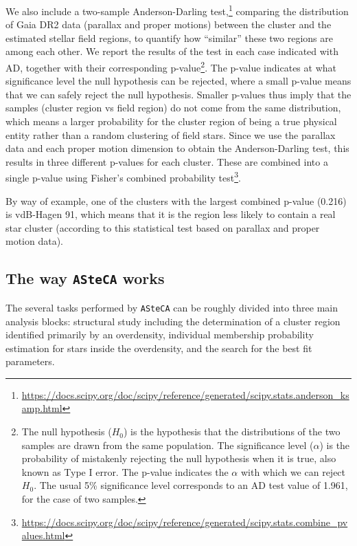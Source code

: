 \documentclass[draft]{aa}
\begin{document}
We also include a two-sample Anderson-Darling
test,\footnote{\url{https://docs.scipy.org/doc/scipy/reference/generated/scipy.stats.anderson_ksamp.html}}
comparing the distribution of Gaia DR2 data (parallax and proper motions)
between the cluster and the estimated stellar field regions, to quantify how
``similar'' these two regions are among each other.
We report the results of the test in each case indicated with AD, together with
their corresponding p-value\footnote{The null hypothesis ($H_{0}$) is the
hypothesis that the distributions of the two samples are drawn from the same
population. The significance level ($\alpha$) is the probability of mistakenly
rejecting the null hypothesis when it is true, also known as Type I error. The
p-value indicates the $\alpha$ with which we can reject $H_{0}$. The usual 5\%
significance level corresponds to an AD test value of 1.961, for the case of two
samples.}.
The p-value indicates at what significance level the null hypothesis
can be rejected, where a small p-value means that we can safely reject the
null hypothesis. Smaller p-values thus imply that the samples (cluster region vs
field region) do not come from the same distribution, which means a larger
probability for the cluster region of being a true physical entity rather than a
random clustering of field stars.
Since we use the parallax data and each proper motion dimension to obtain the
Anderson-Darling test, this results in three different p-values for each
cluster. These are combined into a single p-value using Fisher's combined
probability
test\footnote{\url{https://docs.scipy.org/doc/scipy/reference/generated/scipy.stats.combine_pvalues.html}}.

By way of example, one of the clusters with the largest combined p-value 
(0.216) is vdB-Hagen 91, which means that it is the region less likely to
contain a real star cluster (according to this statistical test based on
parallax and proper motion data).



\subsection{The way \texttt{ASteCA} works}
\label{ssec:asteca_works}

The several tasks performed by \texttt{ASteCA} can be roughly divided into three
main analysis blocks: structural study including the determination of a cluster
region identified primarily by an overdensity, individual membership probability
estimation for stars inside the overdensity, and the search for the best fit
parameters.\\
\end{document}
